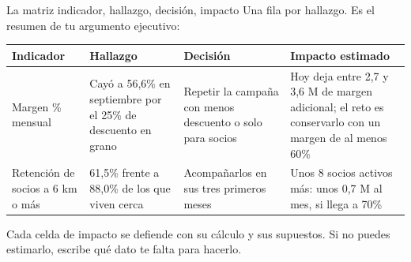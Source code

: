 \documentclass[aspectratio=169,11pt]{beamer}
\begin{document}
\begin{frame}[t]{La matriz indicador, hallazgo, decisión, impacto}
  \small Una fila por hallazgo. Es el resumen de tu argumento ejecutivo:
  \vspace{0.1cm}

  \footnotesize
  \renewcommand{\arraystretch}{1.25}
  \begin{tabular}{@{}L{2.8cm}L{3.4cm}L{3.2cm}L{3.3cm}@{}}
    \toprule
    \textbf{Indicador} & \textbf{Hallazgo} & \textbf{Decisión} & \textbf{Impacto estimado} \\
    \midrule
    Margen \% mensual & Cayó a 56,6\% en septiembre por el 25\% de descuento en grano & Repetir la campaña con menos descuento o solo para socios & Hoy deja entre 2,7 y 3,6 M de margen adicional; el reto es conservarlo con un margen de al menos 60\% \\
    Retención de socios a 6 km o más & 61,5\% frente a 88,0\% de los que viven cerca & Acompañarlos en sus tres primeros meses & Unos 8 socios activos más: unos 0,7 M al mes, si llega a 70\% \\
    \bottomrule
  \end{tabular}
  \vspace{0.15cm}

  \footnotesize Cada celda de impacto se defiende con su cálculo y sus
  supuestos. Si no puedes estimarlo, escribe qué dato te falta para
  hacerlo.
\end{frame}

\end{document}
